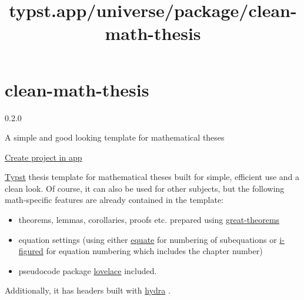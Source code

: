\title{typst.app/universe/package/clean-math-thesis}

\label{banner}
\label{template-thumbnail}

\section{clean-math-thesis}\label{clean-math-thesis}

{ 0.2.0 }

A simple and good looking template for mathematical theses

\href{/app?template=clean-math-thesis&version=0.2.0}{Create project in
app}

\label{readme}
\href{https://github.com/sebaseb98/clean-math-thesis/actions/workflows/build.yml}{\pandocbounded{}}
\href{https://github.com/sebaseb98/clean-math-thesis}{}
\href{https://opensource.org/licenses/MIT}{\pandocbounded{}}

\href{https://typst.app/home/}{Typst} thesis template for mathematical
theses built for simple, efficient use and a clean look. Of course, it
can also be used for other subjects, but the following math-specific
features are already contained in the template:

\begin{itemize}
\tightlist
\item
  theorems, lemmas, corollaries, proofs etc. prepared using
  \href{https://typst.app/universe/package/great-theorems}{great-theorems}
\item
  equation settings (using either
  \href{https://typst.app/universe/package/equate}{equate} for numbering
  of subequations or
  \href{https://typst.app/universe/package/i-figured/}{i-figured} for
  equation numbering which includes the chapter number)
\item
  pseudocode package
  \href{https://typst.app/universe/package/lovelace}{lovelace} included.
\end{itemize}

Additionally, it has headers built with
\href{https://typst.app/universe/package/hydra}{hydra} .

